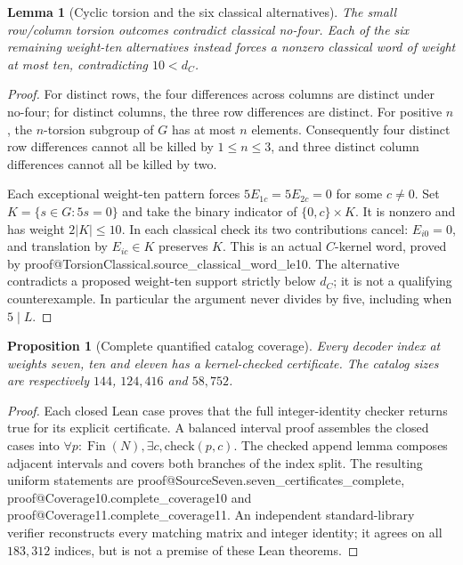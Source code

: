 \documentclass[11pt]{article}
\makeatletter
\newtheorem{lemma}[theorem]{Lemma}
\newtheorem{proposition}[theorem]{Proposition}
\theoremstyle{definition}\newtheorem{definition}[theorem]{Definition}
\newcommand{\lean}[2]{\csname proof@#1.#2\endcsname}
\makeatother
\begin{document}
\begin{lemma}[Cyclic torsion and the six classical alternatives]\label{lem:torsion}
The small row/column torsion outcomes contradict classical no-four.
Each of the six remaining weight-ten alternatives instead forces a nonzero
classical word of weight at most ten, contradicting $10<d_C$.
\end{lemma}
\begin{proof}
For distinct rows, the four differences across columns are distinct under
no-four; for distinct columns, the three row differences are distinct.
For positive $n$, the $n$-torsion subgroup of $G$ has at most $n$ elements. Consequently four
distinct row differences cannot all be killed by $1\leq n\leq3$, and three distinct
column differences cannot all be killed by two.

Each exceptional weight-ten pattern forces $5E_{1c}=5E_{2c}=0$ for some
$c\ne0$. Set $K=\{s\in G:5s=0\}$ and take the binary indicator of
$\{0,c\}\times K$. It is nonzero and has weight $2|K|\leq10$.
In each classical check its two contributions cancel: $E_{i0}=0$, and
translation by $E_{ic}\in K$ preserves $K$. This is an actual $C$-kernel word,
proved by \lean{TorsionClassical}{source_classical_word_le10}.
The alternative contradicts a proposed weight-ten support strictly below
$d_C$; it is not a qualifying counterexample. In particular the argument
never divides by five, including when $5\mid L$.
\end{proof}

\begin{proposition}[Complete quantified catalog coverage]\label{prop:coverage}
Every decoder index at weights seven, ten and eleven has a kernel-checked
certificate. The catalog sizes are respectively $144$, $124,416$ and $58,752$.
\end{proposition}
\begin{proof}
Each closed Lean case proves that the full integer-identity checker returns
true for its explicit certificate. A balanced interval proof assembles the
closed cases into $\forall p:\operatorname{Fin}(N),\exists c,\mathrm{check}(p,c)$.
The checked append lemma composes adjacent intervals and covers both branches
of the index split. The resulting uniform statements are
\lean{SourceSeven}{seven_certificates_complete},
\lean{Coverage10}{complete_coverage10} and
\lean{Coverage11}{complete_coverage11}.
An independent standard-library verifier reconstructs every matching matrix
and integer identity; it agrees on all $183,312$ indices, but is not a premise
of these Lean theorems.
\end{proof}
\end{document}
